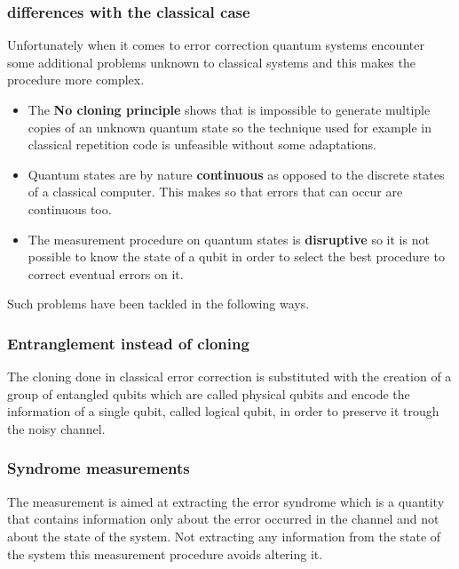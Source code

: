 \documentclass{article}
\begin{document}
\subsubsection{differences with the classical case}

Unfortunately when it comes to error correction quantum systems encounter
some additional problems unknown to classical systems and this makes the
procedure more complex.
\begin {itemize}

\item The \textbf{No cloning principle} shows that is impossible to generate
multiple copies of an unknown quantum state so the technique used for example
in classical repetition code is unfeasible without some adaptations.

\item Quantum states are by nature \textbf{continuous} as opposed to the
discrete states of a classical computer.
This makes so that errors that can occur are continuous too.

\item The measurement procedure on quantum states is \textbf{disruptive} so it is not
possible to know the state of a qubit in order to select the best procedure
to correct eventual errors on it.
\end{itemize}


Such problems have been tackled in the following ways.

\subsubsection{Entranglement instead of cloning}

The cloning done in classical error correction is substituted with
the creation of a group of entangled qubits which are called physical qubits
and encode the information of a single qubit, called logical qubit,  in order
to preserve it trough the noisy channel.


\subsubsection{Syndrome measurements}

The measurement is aimed at extracting the error syndrome which
is a quantity that contains information only about the error occurred
in the channel and not about the state of the system.
Not extracting any information from the state of the system
this measurement procedure avoids altering it.
\end{document}
